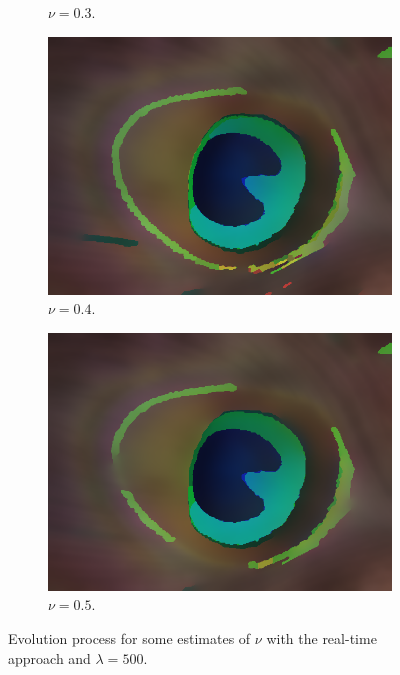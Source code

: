 \documentclass[abstracton]{scrreprt}
\begin{document}
\begin{figure}[!ht]
\begin{subfigure}[b]{0.24\textwidth}
                    \caption{$\nu = 0.3$.}
                \end{subfigure}
                \begin{subfigure}[b]{0.24\textwidth}
                    \includegraphics[width=\textwidth]{img/segmentation/rt/04peacock-feather.png}
                    \caption{$\nu = 0.4$.}
                \end{subfigure}
                \begin{subfigure}[b]{0.24\textwidth}
                    \includegraphics[width=\textwidth]{img/segmentation/rt/05peacock-feather.png}
                    \caption{$\nu = 0.5$.}
                \end{subfigure}
                \caption[Evolution process for image segmentation with real-time Mumford-Shah.]{Evolution process for some estimates of $\nu$ with the real-time approach and $\lambda = 500$.}
            \label{fig:segmentation_evolution_test_images_rt}
            \end{figure}
\end{document}
